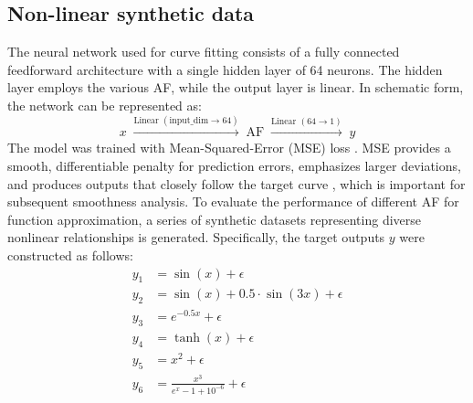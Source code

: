 \documentclass[11pt]{article}
\begin{document}
\subsection{Non-linear synthetic data}
The neural network used for curve fitting consists of a fully connected feedforward 
architecture with a single hidden layer of 64 neurons. 
The hidden layer employs the various AF, while the output layer is linear. 
In schematic form, the network can be represented as:
\[
x \;\xrightarrow{\text{Linear } (\text{input\_dim} \to 64)}\;
\text{AF} \;\xrightarrow{\text{Linear } (64 \to 1)}\; y
\]
The model was trained with Mean-Squared-Error (MSE) loss \cite{BickelDoksum2015MathStats}.
MSE provides a smooth, differentiable penalty for prediction errors, 
emphasizes larger deviations, and produces outputs that closely follow 
the target curve \cite{Bishop2006PRML}, which is important for subsequent smoothness analysis.
To evaluate the performance of different AF for function approximation, 
a series of synthetic datasets representing diverse nonlinear relationships is generated. 
Specifically, the target outputs $y$ were constructed as follows:
\begin{align*}
y_1 &= \sin(x) + \epsilon\tag{a} \\
y_2 &= \sin(x) + 0.5 \cdot \sin(3x) + \epsilon\tag{b} \\
y_3 &= e^{-0.5 x} + \epsilon\tag{c} \\
y_4 &= \tanh(x) + \epsilon\tag{d} \\
y_5 &= x^2 +  \epsilon\tag{e} \\
y_6 &= \frac{x^3}{e^{x} - 1 + 10^{-6}} + \epsilon\tag{f}
\end{align*}
\end{document}
